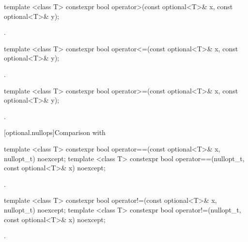 %
\begin{itemdecl}
template <class T> constexpr bool operator>(const optional<T>& x, const optional<T>& y);
\end{itemdecl}

\begin{itemdescr}
\pnum
\returns
{}.
\end{itemdescr}

%
\begin{itemdecl}
template <class T> constexpr bool operator<=(const optional<T>& x, const optional<T>& y);
\end{itemdecl}

\begin{itemdescr}
\pnum
\returns
{}.
\end{itemdescr}

%
\begin{itemdecl}
template <class T> constexpr bool operator>=(const optional<T>& x, const optional<T>& y);
\end{itemdecl}

\begin{itemdescr}
\pnum
\returns
{}.
\end{itemdescr}

[optional.nullops]{Comparison with }

%
\begin{itemdecl}
template <class T> constexpr bool operator==(const optional<T>& x, nullopt_t) noexcept;
template <class T> constexpr bool operator==(nullopt_t, const optional<T>& x) noexcept;
\end{itemdecl}

\begin{itemdescr}
\pnum
\returns
{}.
\end{itemdescr}

%
\begin{itemdecl}
template <class T> constexpr bool operator!=(const optional<T>& x, nullopt_t) noexcept;
template <class T> constexpr bool operator!=(nullopt_t, const optional<T>& x) noexcept;
\end{itemdecl}

\begin{itemdescr}
\pnum
\returns
{}.
\end{itemdescr}

